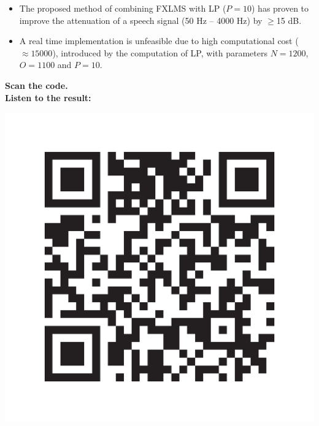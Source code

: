\large
\begin{itemize}
	\item The proposed method of combining FXLMS with LP ($P=10$) has proven to improve the attenuation of a speech signal (50 Hz -- 4000 Hz) by  $\geq$15 dB. \\
	\item A real time implementation is unfeasible due to high computational cost ($\approx15000$), introduced by the computation of LP, with parameters $N=1200$, $O=1100$ and $P=10$. \\
\end{itemize}
\vspace{-3mm}
 \begin{minipage}{.8\columnwidth}
 	\begin{center}
	 	\textbf{Scan the code.}\\
	 	\textbf{Listen to the result:}
 	\end{center}
 \end{minipage}%
 \begin{minipage}{0.2\columnwidth}
 	\includegraphics[width=\textwidth]{figures/QRCODE.pdf}
 \end{minipage}